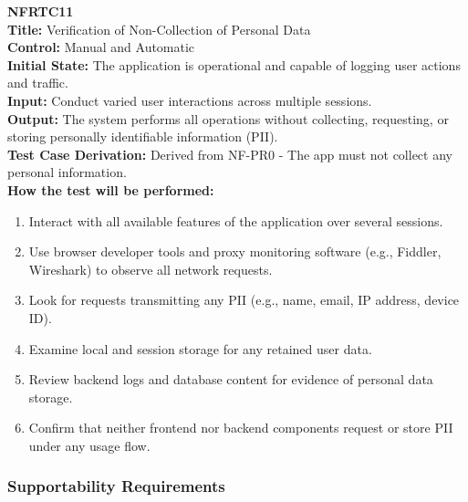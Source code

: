 \documentclass[12pt, titlepage]{article}
\begin{document}
\textbf{NFRTC11}\\
\textbf{Title:} Verification of Non-Collection of Personal Data\\
\textbf{Control:} Manual and Automatic\\
\textbf{Initial State:} The application is operational and capable of logging user actions and traffic.\\
\textbf{Input:} Conduct varied user interactions across multiple sessions.\\
\textbf{Output:} The system performs all operations without collecting, requesting, or storing personally identifiable information (PII).\\
\textbf{Test Case Derivation:} Derived from NF-PR0 - The app must not collect any personal information.\\
\textbf{How the test will be performed:}
\begin{enumerate}
  \item Interact with all available features of the application over several sessions.
  \item Use browser developer tools and proxy monitoring software (e.g., Fiddler, Wireshark) to observe all network requests.
  \item Look for requests transmitting any PII (e.g., name, email, IP address, device ID).
  \item Examine local and session storage for any retained user data.
  \item Review backend logs and database content for evidence of personal data storage.
  \item Confirm that neither frontend nor backend components request or store PII under any usage flow.
\end{enumerate}
\vspace{1em}
\subsubsection{Supportability Requirements}
\end{document}
